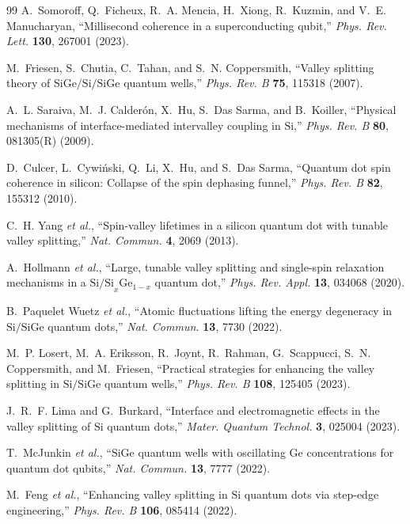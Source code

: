 \documentclass[11pt,letterpaper]{article}
\theoremstyle{definition}
\begin{document}
\begin{thebibliography}{99}
A.~Somoroff, Q.~Ficheux, R.~A. Mencia, H.~Xiong, R.~Kuzmin, and V.~E. Manucharyan, ``Millisecond coherence in a superconducting qubit,'' \textit{Phys. Rev. Lett.} \textbf{130}, 267001 (2023).

M.~Friesen, S.~Chutia, C.~Tahan, and S.~N. Coppersmith, ``Valley splitting theory of $\mathrm{SiGe/Si/SiGe}$ quantum wells,'' \textit{Phys. Rev. B} \textbf{75}, 115318 (2007).

A.~L. Saraiva, M.~J. Calder\'on, X.~Hu, S.~Das Sarma, and B.~Koiller, ``Physical mechanisms of interface-mediated intervalley coupling in $\mathrm{Si}$,'' \textit{Phys. Rev. B} \textbf{80}, 081305(R) (2009).

D.~Culcer, L.~Cywi\'nski, Q.~Li, X.~Hu, and S.~Das Sarma, ``Quantum dot spin coherence in silicon: Collapse of the spin dephasing funnel,'' \textit{Phys. Rev. B} \textbf{82}, 155312 (2010).

C.~H. Yang \textit{et al.}, ``Spin-valley lifetimes in a silicon quantum dot with tunable valley splitting,'' \textit{Nat. Commun.} \textbf{4}, 2069 (2013).

A.~Hollmann \textit{et al.}, ``Large, tunable valley splitting and single-spin relaxation mechanisms in a $\mathrm{Si/Si}_x\mathrm{Ge}_{1-x}$ quantum dot,'' \textit{Phys. Rev. Appl.} \textbf{13}, 034068 (2020).

B.~Paquelet Wuetz \textit{et al.}, ``Atomic fluctuations lifting the energy degeneracy in $\mathrm{Si/SiGe}$ quantum dots,'' \textit{Nat. Commun.} \textbf{13}, 7730 (2022).

M.~P. Losert, M.~A. Eriksson, R.~Joynt, R.~Rahman, G.~Scappucci, S.~N. Coppersmith, and M.~Friesen, ``Practical strategies for enhancing the valley splitting in $\mathrm{Si/SiGe}$ quantum wells,'' \textit{Phys. Rev. B} \textbf{108}, 125405 (2023).

J.~R.~F. Lima and G.~Burkard, ``Interface and electromagnetic effects in the valley splitting of $\mathrm{Si}$ quantum dots,'' \textit{Mater. Quantum Technol.} \textbf{3}, 025004 (2023).

T.~McJunkin \textit{et al.}, ``$\mathrm{SiGe}$ quantum wells with oscillating $\mathrm{Ge}$ concentrations for quantum dot qubits,'' \textit{Nat. Commun.} \textbf{13}, 7777 (2022).

M.~Feng \textit{et al.}, ``Enhancing valley splitting in $\mathrm{Si}$ quantum dots via step-edge engineering,'' \textit{Phys. Rev. B} \textbf{106}, 085414 (2022).


\end{thebibliography}
\end{document}

